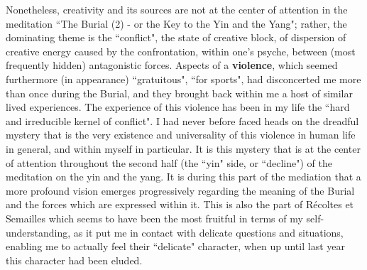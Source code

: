Nonetheless, creativity and its sources are not at the center of attention in the meditation ``The Burial (2) - or the Key to the Yin and the Yang"; rather, the dominating theme is the ``conflict", the state of creative block, of dispersion of creative energy caused by the confrontation, within one's psyche, between (most frequently hidden) antagonistic forces. Aspects of a \textbf{violence}, which seemed furthermore (in appearance) ``gratuitous", ``for sports", had disconcerted me more than once during the Burial, and they brought back within me a host of similar lived experiences. The experience of this violence has been in my life the ``hard and irreducible kernel of conflict". I had never before faced heads on the dreadful mystery that is the very existence and universality of this violence in human life in general, and within myself in particular. It is this mystery that is at the center of attention throughout the second half (the ``yin" side, or ``decline") of the meditation on the yin and the yang. It is during this part of the mediation that a more profound vision emerges progressively regarding the meaning of the Burial and the forces which are expressed within it. This is also the part of R\'ecoltes et Semailles which seems to have been the most fruitful in terms of my self-understanding, as it put me in contact with delicate questions and situations, enabling me to actually feel their ``delicate" character, when up until last year this character had been eluded. 


